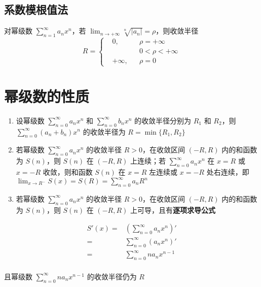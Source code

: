 \documentclass[lang = zh , final , oneside , openany , titlepage , zihao = -4 , linespread = 1.3 , baselineskip = false , cjk-font = windows , text-font = newtx , math-font = newtx , math-style = ISO , uppercase-greek = upright , integral-limits = false]{sjtureport}
\begin{document}
\subsection{系数模根值法}

\begin{theorem}
    对幂级数 \(\displaystyle \sum_{n=1}^\infty a_nx^n\)，若
\(\displaystyle \lim_{n\to+\infty}\sqrt[n]{\left\vert a_n\right\vert} = \rho\)，则收敛半径
\[\displaystyle R=\left\{\begin{aligned}&0,&&\rho=+\infty\\  &&&0<\rho<+\infty\\ &+\infty ,&&\rho=0\end{aligned}\right.\]
\end{theorem}

\section{幂级数的性质}

\begin{enumerate}
\item
  设幂级数 \(\displaystyle \sum_{n=0}^\infty a_nx^n\) 和
  \(\displaystyle \sum_{n=0}^\infty b_nx^n\) 的收敛半径分别为 \(R_1\) 和
  \(R_2\)，则 \(\displaystyle \sum_{n=0}^\infty (a_n+b_n)x^n\)
  的收敛半径为 \(R=\min\{R_1,R_2\}\)
\item
  若幂级数 \(\displaystyle \sum_{n=0}^\infty a_nx^n\) 的收敛半径
  \(R>0\)，在收敛区间 \((-R,R)\) 内的和函数为 \(S(n)\)，则 \(S(n)\) 在
  \((-R,R)\) 上连续；若 \(\displaystyle\sum_{n=0}^\infty a_nx^n\) 在
  \(x=R\) 或 \(x=-R\) 收敛，则和函数 \(S(n)\) 在 \(x=R\) 左连续或
  \(x=-R\) 处右连续，即
  \(\displaystyle \lim_{x\to R^-}S(x)=S(R)=\sum_{n=0}^\infty a_nR^n\)
\item
  若幂级数 \(\displaystyle \sum_{n=0}^\infty a_nx^n\) 的收敛半径
  \(R>0\)，在收敛区间 \((-R,R)\) 内的和函数为 \(S(n)\)，则 \(S(n)\) 在
  \((-R,R)\) 上可导，且有\textbf{逐项求导公式}
\end{enumerate}

\[\begin{aligned}
  S'(x) = &\left(\sum_{n=0}^\infty a_nx^n\right)'\\
    = &\sum_{n=0}^\infty \left(a_nx^n\right)'\\
    = &\sum_{n=0}^\infty na_nx^{n-1}\\
  \end{aligned}\]

且幂级数 \(\displaystyle \sum_{n=0}^\infty na_nx^{n-1}\) 的收敛半径仍为
\(R\)
\end{document}
